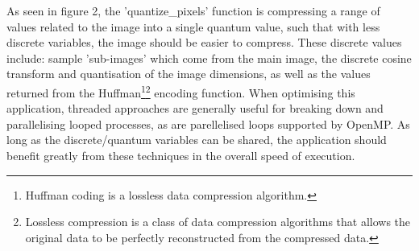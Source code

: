 \documentclass[12pt, a4paper]{article}
\begin{document}
As seen in figure 2, the 'quantize\_pixels' function is compressing a range of values related to the image into a single quantum value, such that with less discrete variables, the image should be easier to compress. These discrete values include: sample 'sub-images' which come from the main image, the discrete cosine transform and quantisation of the image dimensions, as well as the values returned from the Huffman\footnote{Huffman coding is a lossless data compression algorithm.}\footnote{Lossless compression is a class of data compression algorithms that allows the original data to be perfectly reconstructed from the compressed data.} encoding function. When optimising this application, threaded approaches are generally useful for breaking down and parallelising looped processes, as are parellelised loops supported by OpenMP. As long as the discrete/quantum variables can be shared, the application should benefit greatly from these techniques in the overall speed of execution. \\
\end{document}
